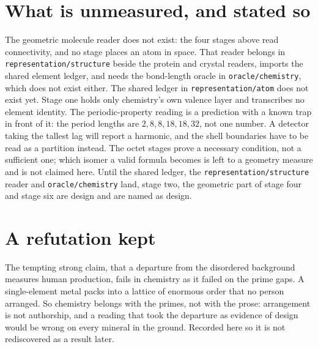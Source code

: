 \section*{What is unmeasured, and stated so}

The geometric molecule reader does not exist: the four stages above read connectivity, and no stage
places an atom in space. That reader belongs in \texttt{representation/structure} beside the protein
and crystal readers, imports the shared element ledger, and needs the bond-length oracle in
\texttt{oracle/chemistry}, which does not exist either. The shared ledger in
\texttt{representation/atom} does not exist yet. Stage one holds only chemistry's own valence layer
and transcribes no element identity. The periodic-property reading is a prediction with a known trap
in front of it: the period lengths are \(2, 8, 8, 18, 18, 32\), not one number. A detector taking the
tallest lag will report a harmonic, and the shell boundaries have to be read as a partition instead.
The octet stages prove a necessary condition, not a sufficient one; which isomer a valid formula
becomes is left to a geometry measure and is not claimed here. Until the shared ledger, the
\texttt{representation/structure} reader and \texttt{oracle/chemistry} land, stage two, the geometric
part of stage four and stage six are design and are named as design.

\section*{A refutation kept}

The tempting strong claim, that a departure from the disordered background measures human production,
fails in chemistry as it failed on the prime gaps. A single-element metal packs into a lattice of
enormous order that no person arranged. So chemistry belongs with the primes, not with the prose:
arrangement is not authorship, and a reading that took the departure as evidence of design would be
wrong on every mineral in the ground. Recorded here so it is not rediscovered as a result later.
